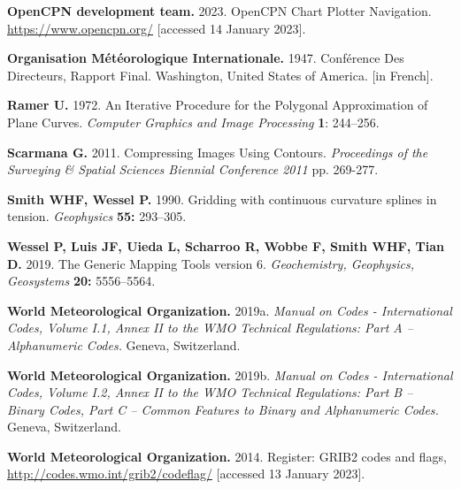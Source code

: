 \documentclass[12pt,a4paper]{article}
\begin{document}
\begin{thebibliography}{00}
\textbf{OpenCPN development team.}
2023.
OpenCPN Chart Plotter Navigation.
\url{https://www.opencpn.org/}
[accessed 14 January 2023].

\textbf{Organisation Météorologique Internationale.}
1947.
Conférence Des Directeurs, Rapport Final.
Washington, United States of America. [in French].

\textbf{Ramer U.}
1972.
An Iterative Procedure for the Polygonal Approximation of Plane Curves.
\textsl{Computer Graphics and Image Processing} \textbf{1}: 244--256.

\textbf{Scarmana G.}
2011.
Compressing Images Using Contours.
\textsl{Proceedings of the Surveying \& Spatial Sciences Biennial Conference 2011}
pp. 269-277.

\textbf{Smith WHF, Wessel P.}
1990.
Gridding with continuous curvature splines in tension.
\textsl{Geophysics} \textbf{55:} 293--305.

\textbf{Wessel P, Luis JF, Uieda L, Scharroo R, Wobbe F, Smith WHF, Tian D.}
2019.
The Generic Mapping Tools version 6.
\textsl{Geochemistry, Geophysics, Geosystems} \textbf{20:} 5556--5564.

\textbf{World Meteorological Organization.}
2019a.
\textsl{Manual on Codes - International Codes, Volume I.1, Annex II to the WMO
Technical Regulations: Part A -- Alphanumeric Codes.}
Geneva, Switzerland.

\textbf{World Meteorological Organization.}
2019b.
\textsl{Manual on Codes - International Codes, Volume I.2, Annex II
to the WMO Technical Regulations: Part B -- Binary Codes, Part C -- Common
Features to Binary and Alphanumeric Codes.}
Geneva, Switzerland.

\textbf{World Meteorological Organization.}
2014.
Register: GRIB2 codes and flags,
\url{http://codes.wmo.int/grib2/codeflag/}
[accessed 13 January 2023].

\end{thebibliography}
   
\end{document}
